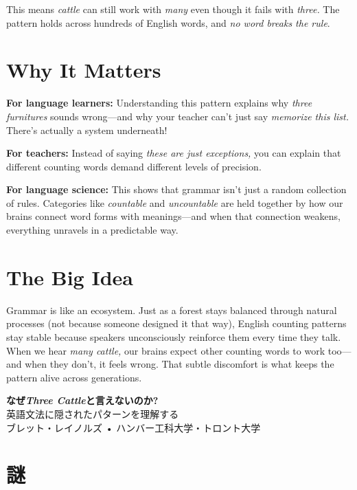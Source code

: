 \documentclass[11pt,a4paper]{article}
\begin{document}
This means \textit{cattle} can still work with \textit{many} even though it fails with \textit{three.} The pattern holds across hundreds of English words, and \textit{no word breaks the rule}.

\section*{Why It Matters}

\textbf{For language learners:} Understanding this pattern explains why \textit{three furnitures} sounds wrong—and why your teacher can't just say \textit{memorize this list.} There's actually a system underneath!

\textbf{For teachers:} Instead of saying \textit{these are just exceptions,} you can explain that different counting words demand different levels of precision.

\textbf{For language science:} This shows that grammar isn't just a random collection of rules. Categories like \textit{countable} and \textit{uncountable} are held together by how our brains connect word forms with meanings—and when that connection weakens, everything unravels in a predictable way.

\section*{The Big Idea}

Grammar is like an ecosystem. Just as a forest stays balanced through natural processes (not because someone designed it that way), English counting patterns stay stable because speakers unconsciously reinforce them every time they talk. When we hear \textit{many cattle,} our brains expect other counting words to work too—and when they don't, it feels wrong. That subtle discomfort is what keeps the pattern alive across generations.

\newpage

\begin{center}
{\Huge\bfseries\color{maincolor} なぜ\textit{Three Cattle}と言えないのか?}\\[0.5em]
{\Large 英語文法に隠されたパターンを理解する}\\[1em]
{\large ブレット・レイノルズ • ハンバー工科大学・トロント大学}
\end{center}

\vspace{0.5em}

\section*{謎}
\end{document}
